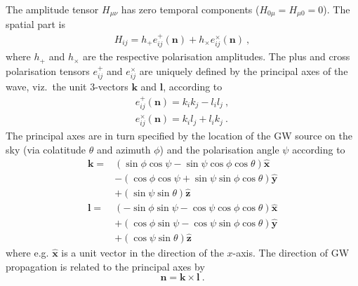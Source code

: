 \documentclass[fleqn,usenatbib,useAMS]{mnras}
\begin{document}
The amplitude tensor $H_{\mu \nu}$ has zero temporal components ($H_{0 \mu} = H_{\mu 0} = 0$). The spatial part is
\begin{align}
	H_{ij} = h_+ e_{ij}^+(\boldsymbol{n}) + h_{\times} e_{ij}^{\times}(\boldsymbol{n}) \ ,
\end{align}
where $h_{+}$ and $h_{\times}$ are the respective polarisation amplitudes. The plus and cross polarisation tensors $e_{ij}^{+}$ and $e_{ij}^{\times}$ are uniquely defined by the principal axes of the wave, viz.\ the unit 3-vectors $\boldsymbol{k}$ and $\boldsymbol{l}$, according to
\begin{align}
	e_{i j}^{+}(\boldsymbol{n}) =k_i k_j-l_i l_j \ , \\
		e_{i j}^{\times}(\boldsymbol{n}) =k_i l_j+l_i k_j \ .
\end{align}
The principal axes are in turn specified by the location of the GW source on the sky (via colatitude $\theta$ and azimuth $\phi$) and the polarisation angle $\psi$ according to
\begin{align}
	\boldsymbol{k}  = &(\sin \phi \cos \psi-\sin \psi \cos \phi \cos \theta) \boldsymbol{\hat{x}} \nonumber \\
	& -(\cos \phi \cos \psi+\sin \psi \sin \phi \cos \theta) \boldsymbol{\hat{y}} \nonumber \\
	& +(\sin \psi \sin \theta) \boldsymbol{\hat{z}} \\
	\boldsymbol{l} = &(-\sin \phi \sin \psi-\cos \psi \cos \phi \cos \theta) \boldsymbol{\hat{x}} \nonumber \\
	& +(\cos \phi \sin \psi-\cos \psi \sin \phi \cos \theta) \boldsymbol{\hat{y}}\nonumber  \\
	& +(\cos \psi \sin \theta) \boldsymbol{\hat{z}}
\end{align}
where e.g. $\boldsymbol{\hat{x}}$ is a unit vector in the direction of the $x$-axis. The direction of GW propagation is related to the principal axes by
\begin{equation}
	\boldsymbol{n} = \boldsymbol{k} \times \boldsymbol{l} \ . 
\end{equation}
\end{document}
